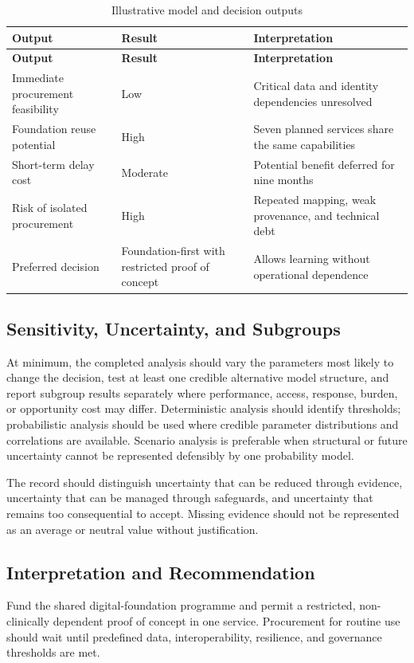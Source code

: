 \begin{longtable}{@{}p{}p{}p{}@{}}
\caption{Illustrative model and decision outputs}
\label{tab:comp-ch02-outputs}\\
\toprule
\textbf{Output} & \textbf{Result} & \textbf{Interpretation} \\
\midrule
\endfirsthead
\toprule
\textbf{Output} & \textbf{Result} & \textbf{Interpretation} \\
\midrule
\endhead
\bottomrule
\endlastfoot
Immediate procurement feasibility & Low & Critical data and identity dependencies unresolved \\
Foundation reuse potential & High & Seven planned services share the same capabilities \\
Short-term delay cost & Moderate & Potential benefit deferred for nine months \\
Risk of isolated procurement & High & Repeated mapping, weak provenance, and technical debt \\
Preferred decision & Foundation-first with restricted proof of concept & Allows learning without operational dependence \\
\end{longtable}

\subsection{Sensitivity, Uncertainty, and Subgroups}
At minimum, the completed analysis should vary the parameters most likely to
change the decision, test at least one credible alternative model structure, and
report subgroup results separately where performance, access, response, burden,
or opportunity cost may differ. Deterministic analysis should identify thresholds;
probabilistic analysis should be used where credible parameter distributions and
correlations are available. Scenario analysis is preferable when structural or
future uncertainty cannot be represented defensibly by one probability model.

The record should distinguish uncertainty that can be reduced through evidence,
uncertainty that can be managed through safeguards, and uncertainty that remains
too consequential to accept. Missing evidence should not be represented as an
average or neutral value without justification.

\subsection{Interpretation and Recommendation}
Fund the shared digital-foundation programme and permit a restricted, non-clinically dependent proof of concept in one service. Procurement for routine use should wait until predefined data, interoperability, resilience, and governance thresholds are met.

